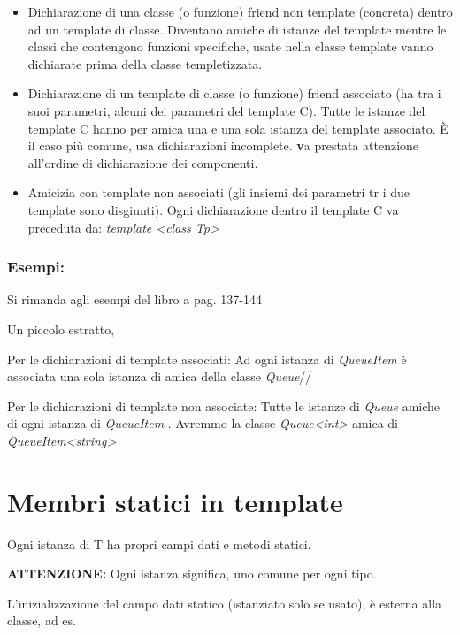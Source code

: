 \begin{itemize}
	\item Dichiarazione di una classe (o funzione) friend non template (concreta) dentro ad un template di classe. Diventano amiche di istanze del template mentre le classi che contengono funzioni specifiche, usate nella classe template vanno dichiarate prima della classe templetizzata.
	\item Dichiarazione di un template di classe (o funzione) friend associato (ha tra i suoi parametri, alcuni dei parametri del template C). Tutte le istanze del template C hanno per amica una e una sola istanza del template associato. \`{E} il caso pi\`{u} comune, usa dichiarazioni incomplete. \textbf va prestata attenzione all'ordine di dichiarazione dei componenti.
	\item Amicizia con template non associati (gli insiemi dei parametri tr i due template sono disgiunti). Ogni dichiarazione dentro il template C va preceduta da: \textit{template <class Tp>}
\end{itemize}

\subsubsection{Esempi:}
Si rimanda agli esempi del libro a pag. 137-144

Un piccolo estratto, 

Per le dichiarazioni di template associati: Ad ogni istanza di \textit{QueueItem} è associata una sola istanza di amica della classe \textit{Queue}//

Per le dichiarazioni di template non associate: Tutte le istanze di \textit{Queue} amiche di ogni istanza di \textit{QueueItem} . Avremmo la classe \textit{Queue<int>} amica di \textit{QueueItem<string>}

\section{Membri statici in template}
Ogni istanza di T ha propri campi dati e metodi statici. 

\textbf{ATTENZIONE:} Ogni istanza significa, uno comune per ogni tipo.

L'inizializzazione del campo dati statico (istanziato solo se usato), è esterna alla classe, ad es. 